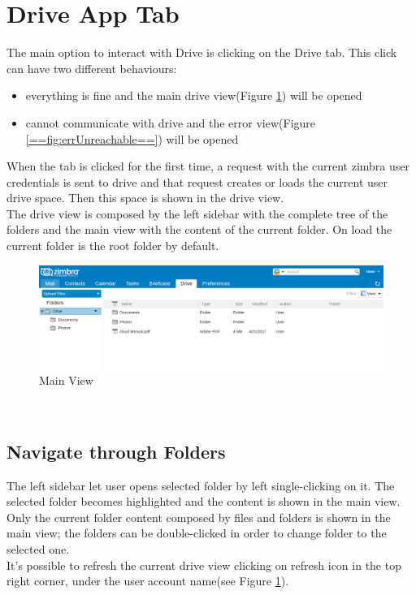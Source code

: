 \section{Drive App Tab}

The main option to interact with Drive is clicking on the Drive tab.
This click can have two different behaviours: 
\begin{itemize}
    \item{everything is fine and the main drive view(Figure \ref{==fig:view==}) will be opened}
    \item{cannot communicate with drive and the error view(Figure \ref{==fig:errUnreachable==}) will be opened}
\end{itemize}

When the tab is clicked for the first time, a request with the current zimbra user credentials is sent to drive and 
that request creates or loads the current user drive space. Then this space is shown in the drive view.\\
The drive view is composed by the left sidebar with the complete tree of the folders 
and the main view with the content of the current folder. On load the current folder is the root folder by default.\\
\begin{figure}[htbp,!h] 
\centering 
\includegraphics[scale=0.25]{src/images/ZD-view.png} 
\caption{Main View} 
\label{==fig:view==}
\end{figure}
\\

\subsection{Navigate through Folders}
The left sidebar let user opens selected folder by left single-clicking on it. 
The selected folder becomes highlighted and the content is shown in the main view.\\
Only the current folder content composed by files and folders is shown in the main view;
the folders can be double-clicked in order to change folder to the selected one.\\
It's possible to refresh the current drive view clicking on refresh icon in the top right corner, under the user account name(see Figure \ref{==fig:view==}).

